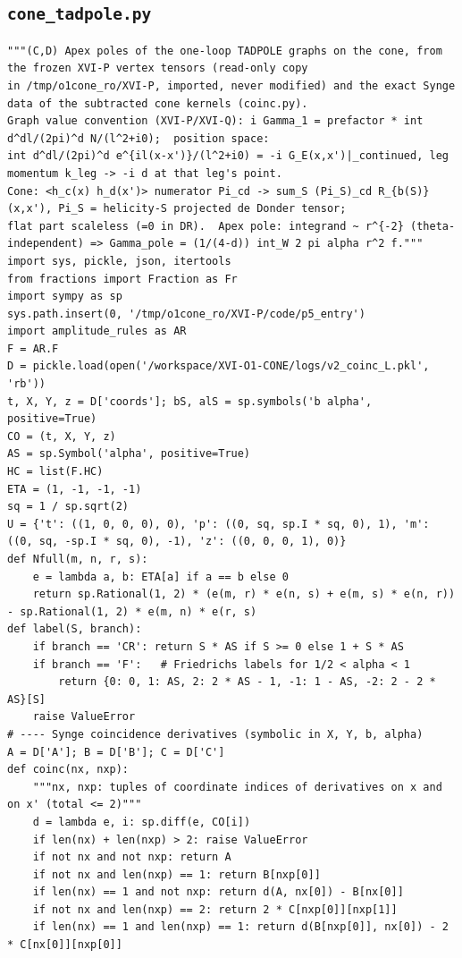 \documentclass[10pt]{article}
\begin{document}
\subsection{\texttt{cone\_tadpole.py}}
\begin{lstlisting}
"""(C,D) Apex poles of the one-loop TADPOLE graphs on the cone, from the frozen XVI-P vertex tensors (read-only copy
in /tmp/o1cone_ro/XVI-P, imported, never modified) and the exact Synge data of the subtracted cone kernels (coinc.py).
Graph value convention (XVI-P/XVI-Q): i Gamma_1 = prefactor * int d^dl/(2pi)^d N/(l^2+i0);  position space:
int d^dl/(2pi)^d e^{il(x-x')}/(l^2+i0) = -i G_E(x,x')|_continued, leg momentum k_leg -> -i d at that leg's point.
Cone: <h_c(x) h_d(x')> numerator Pi_cd -> sum_S (Pi_S)_cd R_{b(S)}(x,x'), Pi_S = helicity-S projected de Donder tensor;
flat part scaleless (=0 in DR).  Apex pole: integrand ~ r^{-2} (theta-independent) => Gamma_pole = (1/(4-d)) int_W 2 pi alpha r^2 f."""
import sys, pickle, json, itertools
from fractions import Fraction as Fr
import sympy as sp
sys.path.insert(0, '/tmp/o1cone_ro/XVI-P/code/p5_entry')
import amplitude_rules as AR
F = AR.F
D = pickle.load(open('/workspace/XVI-O1-CONE/logs/v2_coinc_L.pkl', 'rb'))
t, X, Y, z = D['coords']; bS, alS = sp.symbols('b alpha', positive=True)
CO = (t, X, Y, z)
AS = sp.Symbol('alpha', positive=True)
HC = list(F.HC)
ETA = (1, -1, -1, -1)
sq = 1 / sp.sqrt(2)
U = {'t': ((1, 0, 0, 0), 0), 'p': ((0, sq, sp.I * sq, 0), 1), 'm': ((0, sq, -sp.I * sq, 0), -1), 'z': ((0, 0, 0, 1), 0)}
def Nfull(m, n, r, s):
    e = lambda a, b: ETA[a] if a == b else 0
    return sp.Rational(1, 2) * (e(m, r) * e(n, s) + e(m, s) * e(n, r)) - sp.Rational(1, 2) * e(m, n) * e(r, s)
def label(S, branch):
    if branch == 'CR': return S * AS if S >= 0 else 1 + S * AS
    if branch == 'F':   # Friedrichs labels for 1/2 < alpha < 1
        return {0: 0, 1: AS, 2: 2 * AS - 1, -1: 1 - AS, -2: 2 - 2 * AS}[S]
    raise ValueError
# ---- Synge coincidence derivatives (symbolic in X, Y, b, alpha)
A = D['A']; B = D['B']; C = D['C']
def coinc(nx, nxp):
    """nx, nxp: tuples of coordinate indices of derivatives on x and on x' (total <= 2)"""
    d = lambda e, i: sp.diff(e, CO[i])
    if len(nx) + len(nxp) > 2: raise ValueError
    if not nx and not nxp: return A
    if not nx and len(nxp) == 1: return B[nxp[0]]
    if len(nx) == 1 and not nxp: return d(A, nx[0]) - B[nx[0]]
    if not nx and len(nxp) == 2: return 2 * C[nxp[0]][nxp[1]]
    if len(nx) == 1 and len(nxp) == 1: return d(B[nxp[0]], nx[0]) - 2 * C[nx[0]][nxp[0]]

\end{lstlisting}
\end{document}
